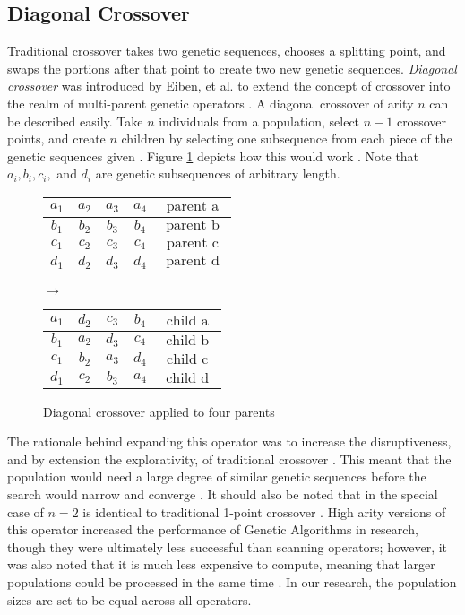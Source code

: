 \subsection*{Diagonal Crossover}
Traditional crossover takes two genetic sequences, chooses a splitting point, and swaps the portions after that point to create two new genetic sequences. \emph{Diagonal crossover} was introduced by Eiben, et al. to extend the concept of crossover into the realm of multi-parent genetic operators \cite{Eiben03}. A diagonal crossover of arity $n$ can be described easily. Take $n$ individuals from a population, select $n-1$ crossover points, and create $n$ children by selecting one subsequence from each piece of the genetic sequences given \cite{Eiben95}. Figure \ref{DC-Fig} depicts how this would work \cite{Eiben95}. Note that $a_i, b_i, c_i,$ and $d_i$ are genetic subsequences of arbitrary length.
\begin{figure}[h!]
\centering
\begin{tabular}{ | c | c | c | c | c | }
\hline
$a_1$ & $a_2$ & $a_3$ & $a_4$ & $\text{ parent a }$ 	\\ \hline
$b_1$ & $b_2$ & $b_3$ & $b_4$ & $\text{ parent b }$ 	\\ \hline
$c_1$ & $c_2$ & $c_3$ & $c_4$ & $\text{ parent c }$ 	\\ \hline
$d_1$ & $d_2$ & $d_3$ & $d_4$ & $\text{ parent d }$ 	\\ \hline
\end{tabular}
$\rightarrow$
\begin{tabular}{ | c | c | c | c | c | }
\hline
$a_1$ & $d_2$ & $c_3$ & $b_4$ & $\text{ child a }$ 	\\ \hline
$b_1$ & $a_2$ & $d_3$ & $c_4$ & $\text{ child b }$ 	\\ \hline
$c_1$ & $b_2$ & $a_3$ & $d_4$ & $\text{ child c }$ 	\\ \hline
$d_1$ & $c_2$ & $b_3$ & $a_4$ & $\text{ child d }$ 	\\ \hline
\end{tabular}
\caption{Diagonal crossover applied to four parents}
\label{DC-Fig}
\end{figure} 

The rationale behind expanding this operator was to increase the disruptiveness, and by extension the explorativity, of traditional crossover \cite{Eiben97}. This meant that the population would need a large degree of similar genetic sequences before the search would narrow and converge \cite{Eiben95}. It should also be noted that in the special case of $n = 2$ is identical to traditional 1-point crossover \cite{Eiben95}. High arity versions of this operator increased the performance of Genetic Algorithms in research, though they were ultimately less successful than scanning operators; however, it was also noted that it is much less expensive to compute, meaning that larger populations could be processed in the same time \cite{Eiben95}. In our research, the population sizes are set to be equal across all operators.